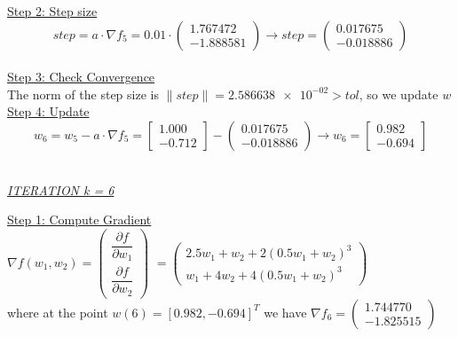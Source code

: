\underline{Step 2: Step size}
\[
step = a \cdot \nabla f_{5} = 0.01 \cdot \left(\begin{array}{c}
	1.767472 \\
-1.888581
\end{array}\right) \rightarrow step =\left(\begin{array}{c}
0.017675 \\
-0.018886
\end{array}\right)
\]
\\[4mm]

\underline{Step 3: Check Convergence}\\
The norm of the step size is $\| step \| = \num{2.586638e-02} > tol$, so we update $w$
\\[4mm]

\underline{Step 4: Update}
\[ 
w_6 = w_5 - a\cdot \nabla f_5 =  \left[\begin{array}{c}
	1.000\\
	-0.712
\end{array}\right] - \left(\begin{array}{c}
0.017675 \\
-0.018886
\end{array}\right) \rightarrow
w_6 = \left[\begin{array}{c}
	0.982\\
	-0.694
\end{array}\right]
\]
\\[4mm]

\begin{center}
	\underline{\textit{ITERATION k = 6}}
\end{center}

\underline{Step 1: Compute Gradient}\\
\(\nabla f(w_1,w_2) = \left(\begin{array}{c}
	\dfrac{\partial f}{\partial w_1} \\[4mm]
	\dfrac{\partial f}{\partial w_2}
\end{array}\right)\) $= \left(\begin{array}{c}
	2.5w_1 + w_2 + 2(0.5w_1+w_2)^3\\[1mm]
	w_1 + 4w_2 + 4(0.5w_1+w_2)^3
\end{array}\right)$ \\[3mm]

where at the point $w\left(6\right) = \left[0.982, -0.694\right]^T$ we have $\nabla f_{6} = \left(\begin{array}{c}
	1.744770 \\
	-1.825515
\end{array}\right)$
\\[4mm]

